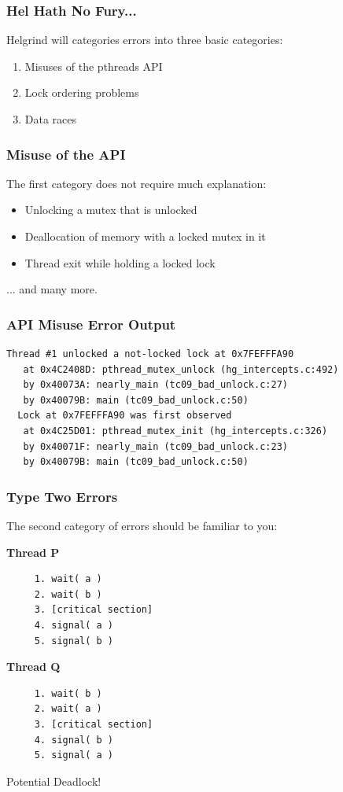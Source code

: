 \begin{frame}
	\frametitle{Hel Hath No Fury...}

	Helgrind will categories errors into three basic categories:

	\begin{enumerate}
		\item Misuses of the pthreads API
		\item Lock ordering problems
		\item Data races
	\end{enumerate}


\end{frame}

\begin{frame}
	\frametitle{Misuse of the API}

	The first category does not require much explanation:


	\begin{itemize}
		\item Unlocking a mutex that is unlocked
		\item Deallocation of memory with a locked mutex in it
		\item Thread exit while holding a locked lock
	\end{itemize}
	... and many more.


\end{frame}

\begin{frame}[fragile]
	\frametitle{API Misuse Error Output}


	\begin{verbatim}
Thread #1 unlocked a not-locked lock at 0x7FEFFFA90
   at 0x4C2408D: pthread_mutex_unlock (hg_intercepts.c:492)
   by 0x40073A: nearly_main (tc09_bad_unlock.c:27)
   by 0x40079B: main (tc09_bad_unlock.c:50)
  Lock at 0x7FEFFFA90 was first observed
   at 0x4C25D01: pthread_mutex_init (hg_intercepts.c:326)
   by 0x40071F: nearly_main (tc09_bad_unlock.c:23)
   by 0x40079B: main (tc09_bad_unlock.c:50)
\end{verbatim}

\end{frame}

\begin{frame}[fragile]
	\frametitle{Type Two Errors}

	The second category of errors should be familiar to you:

	\begin{multicols}{2}
		\textbf{Thread P}
		\begin{verbatim}
	 1. wait( a ) 
	 2. wait( b )
	 3. [critical section]
	 4. signal( a )
	 5. signal( b )
  \end{verbatim}
		\columnbreak
		\textbf{Thread Q}
		\begin{verbatim}
	 1. wait( b ) 
	 2. wait( a )
	 3. [critical section]
	 4. signal( b )
	 5. signal( a )
  \end{verbatim}
	\end{multicols}
	\vspace{-2em}

	Potential Deadlock!

\end{frame}

